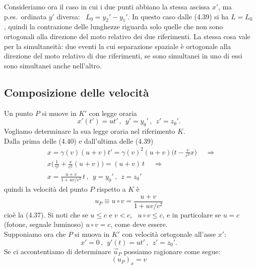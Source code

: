 Consideriamo ora il caso in cui i due punti abbiano la stessa ascissa $x'$, ma
p.es.\ ordinata $y'$ diversa: \ $L_0=y_2'-y_1'$. In questo caso dalle (4.39) si
ha $L=L_0$, quindi la contrazione delle lunghezze riguarda solo quelle che non
sono ortogonali alla direzione del moto relativo dei due riferimenti. La stessa
cosa vale per la simultaneit\`a: due eventi la cui separazione spaziale \`e
ortogonale alla direzione del moto relativo di due riferimenti, se sono
simultanei in uno di essi sono simultanei anche nell'altro.

\subsection{Composizione delle velocit\`a}

Un punto $P$ si muove in $K'$ con legge oraria
\begin{equation}
  x'(t')=ut'\,,\ \ y'=y_0'\,,\ \ z'=z_0'.
  \tag{4.49}
\end{equation}
Vogliamo determinare la sua legge oraria nel riferimento $K$.\\
Dalla prima delle (4.40) e dall'ultima delle (4.39)
\begin{equation}
  \begin{aligned}
    &x=\gamma(v)(u+v)t'=\gamma(v)^2(u+v)\Big(t-\frac{v}{c^2}x\Big)
    \quad\ \Rightarrow\\
    &x\Big(\frac{1}{\gamma^2}+\frac{v}{c^2}(u+v)\Big)=(u+v)\,t
    \quad\ \Rightarrow\\
    &x=\frac{u+v}{1+uv/c^2}\,t\,,\ \ y=y_0'\,,\ \ z=z_0'
  \end{aligned}
  \tag{4.50}
\end{equation}
quindi la velocit\`a del punto $P$ rispetto a $K$ \`e
\begin{equation}
  u_P\equiv u\circ v=\frac{u+v}{1+uv/c^2}
  \tag{4.51}
\end{equation}
cio\`e la (4.37). Si noti che se $u\le c$ e $v<c$, \ $u\circ v\le c$, e in
particolare se $u=c$ (fotone, segnale luminoso) $u\circ v=c$, come deve
essere.\\
Supponiamo ora che $P$ si muova in $K'$ con velocit\`a ortogonale all'asse $x'$:
\begin{equation}
  x'=0\,,\ \ y'(t)=ut'\,,\ \ z'=z_0'.
  \tag{4.52}
\end{equation}
Se ci accontentiamo di determinare $\vec u_P$ possiamo ragionare come segue:
\begin{equation}
  (u_P)_x=v
  \tag{4.53}
\end{equation}
